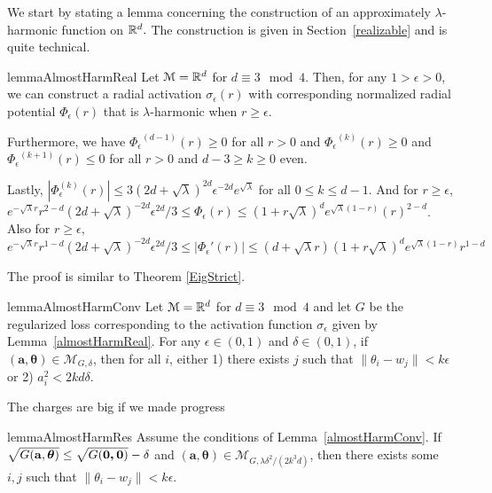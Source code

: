 %
We start by stating a lemma concerning the construction of an approximately
$\lambda$-harmonic function on ${\mathbb{R}}^d.$ The construction is given in
Section~\ref{realizable} and is quite technical. 
%
%
\begin{restatable}{lemma}{AlmostHarmReal}\label{almostHarmReal}
Let $\mathcal{M} = {\mathbb{R}}^d$ for $d \equiv 3 \mod 4$. Then, for any $1 > \epsilon > 0$, we can construct a radial activation $\sigma_\epsilon(r)$ with corresponding normalized radial potential $\Phi_\epsilon(r)$ that is $\lambda$-harmonic when $r \geq \epsilon$.

Furthermore, we have ${\Phi_\epsilon}^{(d-1)}(r) \geq 0$ for all $r  > 0$ and ${\Phi_\epsilon}^{(k)}(r) \geq 0$ and ${\Phi_\epsilon}^{(k+1)}(r)\leq 0$ for all $r > 0$ and $d - 3 \geq k \geq 0 $ even.

Lastly, $|{\Phi}_\epsilon^{(k)}(r)| \leq 3(2d + \sqrt{\lambda})^{2d} \epsilon^{-2d}e^{\sqrt{\lambda}}$ for all $0 \leq k \leq d-1$. And for $r \geq \epsilon$, $e^{-\sqrt{\lambda}r}r^{2-d}(2d+\sqrt{\lambda})^{-2d}\epsilon^{2d}/3\leq {\Phi}_\epsilon(r) \leq (1+r\sqrt{\lambda})^de^{\sqrt{\lambda}(1-r)}(r)^{2-d}$. Also for $r \geq \epsilon$, $ e^{-\sqrt{\lambda}r}r^{1-d}(2d+\sqrt{\lambda})^{-2d}\epsilon^{2d}/3 \leq |{\Phi}_\epsilon'(r)| \leq (d+\sqrt{\lambda}r)(1+ r\sqrt{\lambda})^de^{\sqrt{\lambda}(1- r)} r^{1-d}$
\end{restatable}
%
%
The proof is similar to Theorem \ref{EigStrict}. 
%
\begin{restatable}{lemma}{AlmostHarmConv}\label{almostHarmConv}
Let $\mathcal{M} = {\mathbb{R}}^d$ for $d \equiv 3 \mod 4$ and let $G$ be the regularized loss corresponding to the activation function $\sigma_\epsilon$ given by Lemma~\ref{almostHarmReal}. For any $\epsilon \in (0,1)$ and $\delta \in (0, 1)$, if $\boldsymbol{(a,\theta)} \in \mathcal{M}_{G,\delta}$, then for all $i$, either 1) there exists $j$ such that $\|\theta_i - w_j\| < k\epsilon$ or 2) $a_i^2 < 2kd\delta$.
\end{restatable}
%
The charges are big if we made progress 
%
\begin{restatable}{lemma}{AlmostHarmRes}\label{almostHarmRes}
  Assume the conditions of Lemma~\ref{almostHarmConv}. If
$\sqrt{G({\bf a, \boldsymbol{\theta}})} \leq \sqrt{G(\boldsymbol{0,0})} - \delta$
  and $(\boldsymbol{a,\theta}) \in \mathcal{M}_{G,\lambda \delta^2/(2k^3d)}$,
  then there exists some $i, j$ such that $\|\theta_i - w_j\| <k\epsilon$.
\end{restatable}
